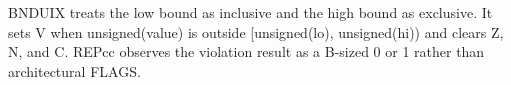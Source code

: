 BNDUIX treats the low bound as inclusive and the high bound as exclusive. It sets V when unsigned(value) is outside [unsigned(lo), unsigned(hi)) and clears Z, N, and C. REPcc observes the violation result as a B-sized 0 or 1 rather than architectural FLAGS.
